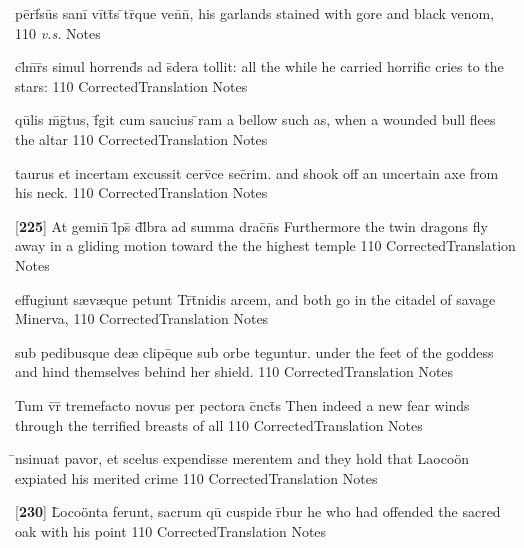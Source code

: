 \latline
  {p\=erf\={}s\=us s\-an\-i\={} v\=itt\={}s \={}tr\={}qu\-e v\-en\={}n\={},}
  { his garlands stained with gore and black venom, }
  {110}
  { \emph{v.s.} }
  { Notes }


\latline
  {cl\={}m\={}r\={}s simul horrend\={}s ad s\={\macron {\i}}dera tollit:}
  { all the while he carried horrific cries to the stars: }
  {110}
  { CorrectedTranslation }
  { Notes }


\latline
  {qu\={}lis m\={}g\={\macron {\i}}tus, f\={}git cum saucius \={}ram}
  { a bellow such as, when a wounded bull flees the altar }
  {110}
  { CorrectedTranslation }
  { Notes }


\latline
  {taurus et incertam excussit cerv\={\macron {\i}}ce sec\={}rim.}
  { and shook off an uncertain axe from his neck.  }
  {110}
  { CorrectedTranslation }
  { Notes }


\latline
  {[\textbf{225}] At gemin\={\macron {\i}} l\={}ps\={} d\={}l\={}bra ad summa drac\={}n\={}s}
  { Furthermore the twin dragons fly away in a gliding motion toward the the highest temple }
  {110}
  { CorrectedTranslation }
  { Notes }


\latline
  {effugiunt s{\ae}v{\ae}que petunt Tr\={\macron {\i}}t\={}nidis arcem,}
  { and both go in the citadel of savage Minerva, }
  {110}
  { CorrectedTranslation }
  { Notes }


\latline
  {sub pedibusque de{\ae} clipe\={\macron {\i}}que sub orbe teguntur.}
  { under the feet of the goddess and hind themselves behind her shield. }
  {110}
  { CorrectedTranslation }
  { Notes }


\latline
  {Tum v\={}r\={} tremefacto novus per pectora c\={}nct\={\macron {\i}}s}
  { Then indeed a new fear winds through the terrified breasts of all }
  {110}
  { CorrectedTranslation }
  { Notes }


\latline
  {\={\macron {\i}}nsinuat pavor, et scelus expendisse merentem}
  { and they hold that Laoco\"on expiated his merited crime  }
  {110}
  { CorrectedTranslation }
  { Notes }


\latline
  {[\textbf{230}] L\={}oco\"{o}nta ferunt, sacrum qu\={\macron {\i}} cuspide r\={}bur }
  { he who had offended the sacred oak with his point }
  {110}
  { CorrectedTranslation }
  { Notes }


